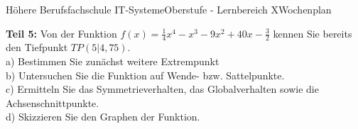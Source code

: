 \documentclass[oneside,openany,headings=optiontotoc,11pt,numbers=noenddot]{scrreprt}
\begin{document}
\begin{worksheet}{Höhere Berufsfachschule IT-Systeme}{Oberstufe - Lernbereich X}{Wochenplan }
\begin{framed}
			\textbf{Teil 5:} Von der Funktion \(f(x) = \frac{1}{4}x^4 - x^3 - 9x^2 + 40x - \frac{3}{2}\) kennen Sie bereits den Tiefpunkt \(TP(5|4,75)\).\\
			a) Bestimmen Sie zunächst weitere Extrempunkt\\
			b) Untersuchen Sie die Funktion auf Wende- bzw. Sattelpunkte.\\
			c) Ermitteln Sie das Symmetrieverhalten, das Globalverhalten sowie die Achsenschnittpunkte.\\
			d) Skizzieren Sie den Graphen der Funktion.
		\end{framed}
	\end{worksheet}
\end{document}
